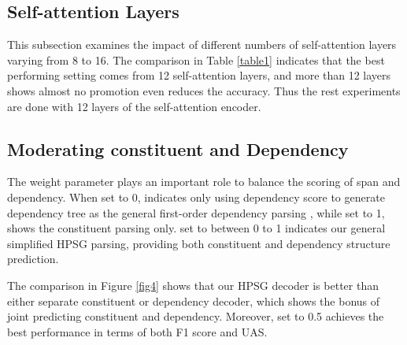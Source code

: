 \documentclass[11pt,a4paper]{article}
\begin{document}
\subsection{Self-attention Layers} 

This subsection examines the impact of different numbers of self-attention layers varying from 8 to 16.
The comparison in Table \ref{table1} indicates that the best performing setting comes from 12 self-attention layers, and more than 12 layers shows almost no promotion even reduces the accuracy.
Thus the rest experiments are done with 12 layers of the self-attention encoder.

\subsection{Moderating constituent and Dependency}

The weight parameter  plays an important role to balance the scoring of span and dependency.
When  set to 0, indicates only using dependency score to generate dependency tree as the general first-order dependency parsing \cite{EisnerP96}, while  set to 1, shows the constituent parsing only.
 set to between 0 to 1 indicates our general simplified HPSG parsing, providing both constituent and dependency structure prediction.

The comparison in Figure \ref{fig4} shows that our HPSG decoder is better than either separate constituent or dependency decoder, which shows the bonus of joint predicting constituent and dependency.
Moreover,  set to 0.5 achieves the best performance in terms of both F1 score and UAS.

\begin{table}[t!]
    \centering
    \caption{\label{table3} English dev set performance of joint span HPSG parsing. The \textit{converted} means the corresponding dependency parsing results are from the corresponding constituent parse tree using head rules.}
\end{table}
\end{document}
